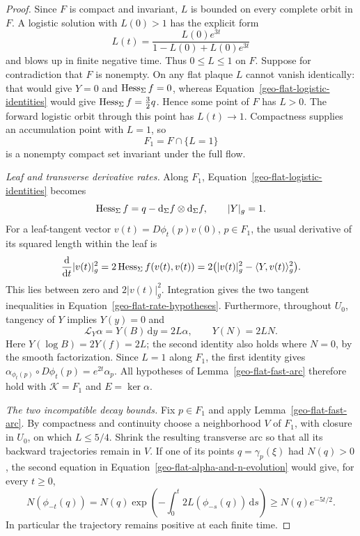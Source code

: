 \begin{proof}
Since $F$ is compact and invariant, $L$ is bounded on every complete
orbit in $F$.  A logistic solution with $L(0)>1$ has the explicit form
\[
 L(t)=\frac{L(0)e^{3t}}{1-L(0)+L(0)e^{3t}}
\]
and blows up in finite negative time.  Thus $0\leq L\leq1$ on $F$.
Suppose for contradiction that $F$ is nonempty.  On any flat plaque
$L$ cannot vanish identically: that would give $Y=0$ and
$\operatorname{Hess}_\Sigma f=0$, whereas
Equation~\eqref{geo-flat-logistic-identities} would give
$\operatorname{Hess}_\Sigma f=\tfrac32 q$.  Hence some point of $F$ has $L>0$.
The forward logistic orbit through this point has $L(t)\to1$.
Compactness supplies an accumulation point with $L=1$, so
\begin{equation}
\label{geo-flat-unit-set}
 F_1=F\cap\{L=1\}
\end{equation}
is a nonempty compact set invariant under the full flow.

\emph{Leaf and transverse derivative rates.}
Along $F_1$, Equation~\eqref{geo-flat-logistic-identities} becomes
\begin{equation}
\label{geo-flat-unit-hessian}
 \operatorname{Hess}_\Sigma f=q-\mathrm d_\Sigma f\otimes\mathrm d_\Sigma f,
 \qquad \lvert Y\rvert_g=1.
\end{equation}
For a leaf-tangent vector $v(t)=D\phi_t(p)v(0)$, $p\in F_1$, the
usual derivative of its squared length within the leaf is
\[
 \frac{\mathrm d}{\mathrm dt}\lvert v(t)\rvert_g^2
 =2\operatorname{Hess}_\Sigma f(v(t),v(t))
 =2\bigl(\lvert v(t)\rvert_g^2-
             \langle Y,v(t)\rangle_g^2\bigr).
\]
This lies between zero and $2\lvert v(t)\rvert_g^2$.  Integration gives
the two tangent inequalities in
Equation~\eqref{geo-flat-rate-hypotheses}.
Furthermore, throughout $U_0$, tangency of $Y$ implies $Y(y)=0$ and
\begin{equation}
\label{geo-flat-alpha-and-n-evolution}
 \mathcal L_Y\alpha=Y(B)\,\mathrm dy=2L\alpha,
 \qquad Y(N)=2LN.
\end{equation}
Here $Y(\log B)=2Y(f)=2L$; the second identity also holds where $N=0$,
by the smooth factorization.  Since $L=1$ along $F_1$, the first
identity gives
$\alpha_{\phi_t(p)}\circ D\phi_t(p)=e^{2t}\alpha_p$.
All hypotheses of Lemma~\ref{geo-flat-fast-arc} therefore hold with
$\mathcal K=F_1$ and $E=\ker\alpha$.

\emph{The two incompatible decay bounds.}
Fix $p\in F_1$ and apply Lemma~\ref{geo-flat-fast-arc}.  By compactness
and continuity choose a neighborhood $V$ of $F_1$, with closure in
$U_0$, on which $L\leq5/4$.  Shrink the resulting transverse arc so
that all its backward trajectories remain in $V$.  If one of its
points $q=\gamma_p(\xi)$ had $N(q)>0$, the second equation in
Equation~\eqref{geo-flat-alpha-and-n-evolution} would give, for every
$t\geq0$,
\begin{equation}
\label{geo-flat-n-lower-bound}
 N(\phi_{-t}(q))
 =N(q)\exp\left(-\int_0^t2L(\phi_{-s}(q))\,\mathrm ds\right)
 \geq N(q)e^{-5t/2}.
\end{equation}
In particular the trajectory remains positive at each finite time.


\end{proof}
